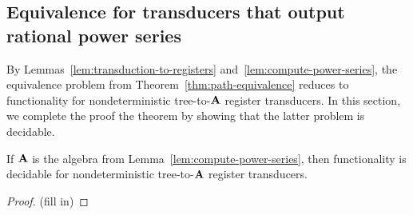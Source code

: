 \subsection{Equivalence for transducers that output rational power series}
\label{sec:decide-power-series}
By Lemmas~\ref{lem:transduction-to-registers} and~\ref{lem:compute-power-series}, the  equivalence problem from Theorem~\ref{thm:path-equivalence} reduces to functionality for nondeterministic tree-to-$\mathbf{A}$ register transducers. In this section, we complete the proof the theorem by showing that the latter problem is decidable.
\begin{lemma}\label{lem:functionality-decidable-power-series} If $\mathbf{A}$ is the algebra from Lemma~\ref{lem:compute-power-series}, then functionality is decidable for nondeterministic tree-to-$\mathbf{A}$ register transducers. 
\end{lemma}
\begin{proof}
    (fill in)
\end{proof}

